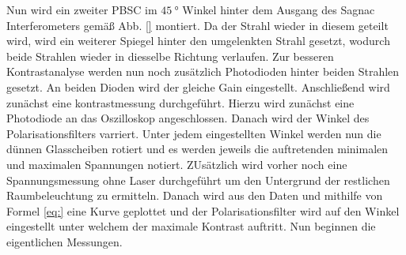  Nun wird ein zweiter PBSC im $\SI{45}{\degree}$ Winkel hinter dem Ausgang des Sagnac Interferometers gemäß Abb. \ref{} montiert. Da der Strahl wieder in diesem geteilt wird, wird ein weiterer Spiegel hinter den umgelenkten Strahl gesetzt, wodurch beide Strahlen wieder in diesselbe Richtung verlaufen. Zur besseren Kontrastanalyse werden nun noch zusätzlich Photodioden hinter beiden Strahlen gesetzt. An beiden Dioden wird der gleiche Gain eingestellt.
 Anschließend wird zunächst eine kontrastmessung durchgeführt. Hierzu wird zunächst eine Photodiode an das Oszilloskop angeschlossen. Danach wird der Winkel des Polarisationsfilters varriert. Unter jedem eingestellten Winkel werden nun die dünnen Glasscheiben rotiert und es werden jeweils die auftretenden minimalen und maximalen Spannungen notiert. ZUsätzlich wird vorher noch eine Spannungsmessung ohne Laser durchgeführt um den Untergrund der restlichen Raumbeleuchtung zu ermitteln. Danach wird aus den Daten und mithilfe von Formel \ref{eq:} eine Kurve geplottet und der Polarisationsfilter wird auf den Winkel eingestellt unter welchem der maximale Kontrast auftritt. 
Nun beginnen die eigentlichen Messungen.
